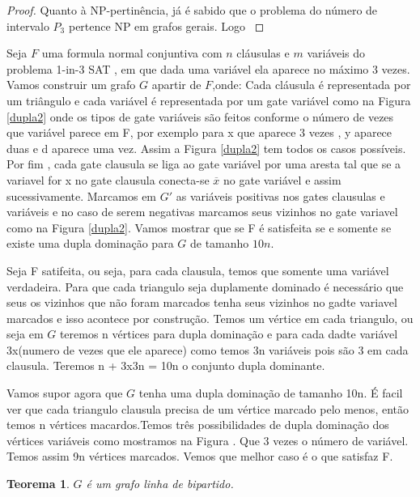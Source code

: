 \documentclass[a4paper,8pt]{article}
\theoremstyle{plain}
\newtheorem{theorem}{Teorema}[section]
\begin{document}
\begin{proof}
Quanto à NP-pertinência, já é sabido que o problema do número de intervalo $P_3$ pertence NP em grafos gerais. Logo \cite{CENTENO} 
\end{proof}

Seja $F$ uma formula normal conjuntiva com $n$ cláusulas e $m$ variáveis do problema 1-in-3 SAT , em que dada uma variável ela aparece no máximo 3 vezes.
Vamos construir um grafo $G$ apartir de $F$,onde:
Cada cláusula é representada por um triângulo e cada variável é representada por um gate variável como na Figura  \ref{dupla2} onde os tipos de gate variáveis são feitos conforme o número de vezes que variável parece em F, por exemplo para x que aparece 3 vezes , y aparece duas e d aparece uma vez. Assim a Figura   \ref{dupla2} tem todos os casos possíveis. Por fim , cada gate clausula se liga ao gate variável por uma aresta tal que se a variavel for x no gate clausula conecta-se $\overline{x}$ no gate variável e assim sucessivamente. Marcamos em $G'$ as variáveis positivas nos gates clausulas e variáveis e no caso de serem negativas marcamos seus vizinhos no gate variavel como na Figura   \ref{dupla2}.
Vamos mostrar que se F é satisfeita se e somente se existe uma dupla dominação para $G$ de tamanho $10n$.

Seja F satifeita, ou seja, para cada clausula, temos que somente uma variável verdadeira. Para que cada triangulo seja duplamente dominado é necessário que seus os vizinhos que não foram marcados tenha seus vizinhos no gadte variavel marcados e isso acontece por construção. Temos um vértice em cada triangulo, ou seja em $G$ teremos n vértices para dupla dominação e para cada dadte variável  3x(numero de vezes que ele aparece) como temos 3n variáveis pois são 3 em cada clausula. Teremos n + 3x3n = 10n o conjunto dupla dominante. 

Vamos supor agora que $G$ tenha uma dupla dominação de tamanho 10n. É facil ver que cada triangulo clausula precisa de um vértice marcado pelo menos, então temos n vértices macardos.Temos três possibilidades de dupla dominação dos vértices variáveis como mostramos na Figura \cite {garraLB3}. Que 3 vezes o número de variável. Temos assim 9n vértices marcados. Vemos que melhor caso é o que satisfaz F.  


\begin{theorem}
 $G$ é um grafo linha de bipartido.
\end{theorem}













 
 
%
\end{document}
